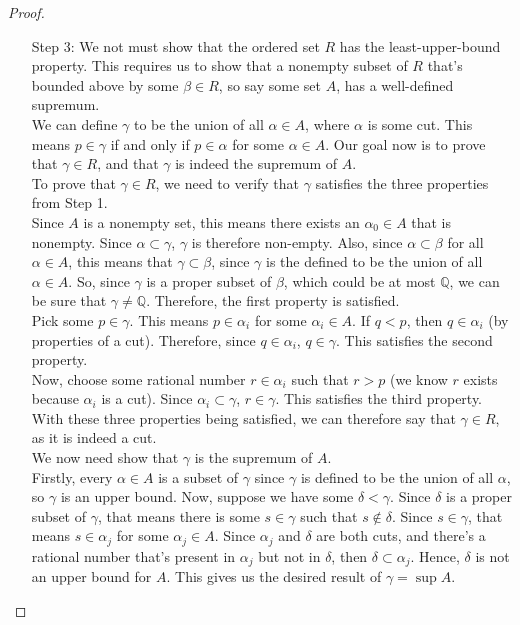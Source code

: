 \documentclass{article}
\theoremstyle{definition}
\begin{document}
\begin{section}
\begin{proof}
\begin{enumerate}
\item[Step 3:] We not must show that the ordered set $R$ has the least-upper-bound property. This requires us to show that a nonempty subset of $R$ that's bounded above by some $\beta\in R$, so say some set $A$, has a well-defined supremum. \\
We can define $\gamma$ to be the union of all $\alpha \in A$, where $\alpha$ is some cut. This means $p \in \gamma$ if and only if  $p \in \alpha$ for some $\alpha \in A$. Our goal now is to prove that $\gamma \in R$, and that $\gamma$ is indeed the supremum of $A$.  \\
To prove that $\gamma \in R$, we need to verify that $\gamma$ satisfies the three properties from Step 1. \\
Since $A$ is a nonempty set, this means there exists an $\alpha_{0} \in A$ that is nonempty. Since $\alpha \subset \gamma$, $\gamma$ is therefore non-empty. Also, since $\alpha \subset \beta$ for all $\alpha \in A$, this means that $\gamma \subset \beta$, since $\gamma$ is the defined to be the union of all $\alpha \in A$. So, since $\gamma$ is a proper subset of $\beta$, which could be at most $\mathbb{Q}$, we can be sure that $\gamma \neq \mathbb{Q}$. Therefore, the first property is satisfied. \checkmark \\
Pick some $p \in \gamma$. This means $p \in \alpha_{i}$ for some $\alpha_{i} \in A$. If $q < p$, then $q \in \alpha_{i}$ (by properties of a cut). Therefore, since $q \in \alpha_{i}$, $q \in \gamma$. This satisfies the second property. \checkmark \\
Now, choose some rational number $r \in \alpha_{i}$ such that $r>p$ (we know $r$ exists because $\alpha_{i}$ is a cut). Since $\alpha_{i} \subset \gamma$, $r \in \gamma$. This satisfies the third property. \checkmark \\
With these three properties being satisfied, we can therefore say that $\gamma \in R$, as it is indeed a cut. \\
We now need show that $\gamma$ is the supremum of $A$. \\
Firstly, every $\alpha \in A$ is a subset of $\gamma$ since $\gamma$ is defined to be the union of all $\alpha$, so $\gamma$ is an upper bound. Now, suppose we have some $\delta < \gamma$. Since $\delta$ is a proper subset of $\gamma$, that means there is some $s \in \gamma$ such that $s \not\in \delta$. Since $s \in \gamma$, that means $s \in \alpha_{j}$ for some $\alpha_{j} \in A$. Since $\alpha_{j}$ and $\delta$ are both cuts, and there's a rational number that's present in $\alpha_{j}$ but not in $\delta$, then $\delta \subset \alpha_{j}$. Hence, $\delta$ is not an upper bound for $A$. This gives us the desired result of $\gamma = \sup A$.

\end{enumerate}
\end{proof}
\end{section}
\end{document}
